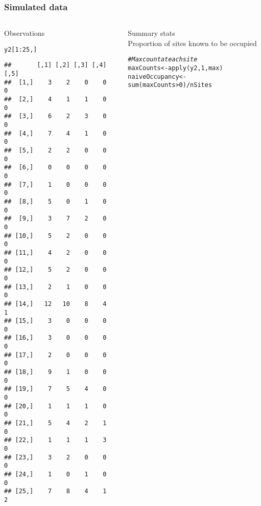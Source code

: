 \documentclass[color=usenames,dvipsnames]{beamer}\usepackage[]{graphicx}\usepackage[]{xcolor}
\makeatletter
\newcommand{\hlnum}[1]{\textcolor[rgb]{0.69,0.494,0}{#1}}%
\newcommand{\hlcom}[1]{\textcolor[rgb]{0.514,0.506,0.514}{\textit{#1}}}%
\newcommand{\hlopt}[1]{\textcolor[rgb]{0,0,0}{#1}}%
\newcommand{\hlstd}[1]{\textcolor[rgb]{0,0,0}{#1}}%
\newcommand{\hlkwb}[1]{\textcolor[rgb]{0,0.341,0.682}{#1}}%
\newcommand{\hlkwd}[1]{\textcolor[rgb]{0.004,0.004,0.506}{#1}}%
\newenvironment{kframe}{%
 \def\at@end@of@kframe{}%
 \ifinner\ifhmode%
  \def\at@end@of@kframe{\end{minipage}}%
  \begin{minipage}{\columnwidth}%
 \fi\fi%
 \def\FrameCommand##1{\hskip\@totalleftmargin \hskip-\fboxsep
 \colorbox{shadecolor}{##1}\hskip-\fboxsep
     \hskip-\linewidth \hskip-\@totalleftmargin \hskip\columnwidth}%
 \MakeFramed {\advance\hsize-\width
   \@totalleftmargin\z@ \linewidth\hsize
   \@setminipage}}%
 {\par\unskip\endMakeFramed%
 \at@end@of@kframe}
\newenvironment{knitrout}{}{} %
\makeatother
\begin{document}
\begin{frame}[fragile]
  \frametitle{Simulated data}
  \begin{columns}
    \begin{column}{0.4\textwidth}
      \small
      Observations
  \vspace{-6pt}
\begin{knitrout}\tiny
{}\color{fgcolor}\begin{kframe}
\begin{alltt}
\hlstd{y2[}\hlnum{1}\hlopt{:}\hlnum{25}\hlstd{,]}
\end{alltt}
\begin{verbatim}
##       [,1] [,2] [,3] [,4] [,5]
##  [1,]    3    2    0    0    0
##  [2,]    4    1    1    0    0
##  [3,]    6    2    3    0    0
##  [4,]    7    4    1    0    0
##  [5,]    2    2    0    0    0
##  [6,]    0    0    0    0    0
##  [7,]    1    0    0    0    0
##  [8,]    5    0    1    0    0
##  [9,]    3    7    2    0    0
## [10,]    5    2    0    0    0
## [11,]    4    2    0    0    0
## [12,]    5    2    0    0    0
## [13,]    2    1    0    0    0
## [14,]   12   10    8    4    1
## [15,]    3    0    0    0    0
## [16,]    3    0    0    0    0
## [17,]    2    0    0    0    0
## [18,]    9    1    0    0    0
## [19,]    7    5    4    0    0
## [20,]    1    1    1    0    0
## [21,]    5    4    2    1    0
## [22,]    1    1    1    3    0
## [23,]    3    2    0    0    0
## [24,]    1    0    1    0    0
## [25,]    7    8    4    1    2
\end{verbatim}
\end{kframe}
\end{knitrout}
  \end{column}
  \begin{column}{0.6\textwidth}
    \pause
    {\centering Summary stats \\}
    \vspace{24pt}
    \small
    Proportion of sites known to be occupied
    \vspace{-6pt}
\begin{knitrout}\scriptsize
{}\color{fgcolor}\begin{kframe}
\begin{alltt}
\hlcom{# Max count at each site}
\hlstd{maxCounts} \hlkwb{<-} \hlkwd{apply}\hlstd{(y2,} \hlnum{1}\hlstd{, max)}
\hlstd{naiveOccupancy} \hlkwb{<-} \hlkwd{sum}\hlstd{(maxCounts}\hlopt{>}\hlnum{0}\hlstd{)}\hlopt{/}\hlstd{nSites}

\end{alltt}
\end{kframe}
\end{knitrout}
\end{column}
\end{columns}
\end{frame}
\end{document}
